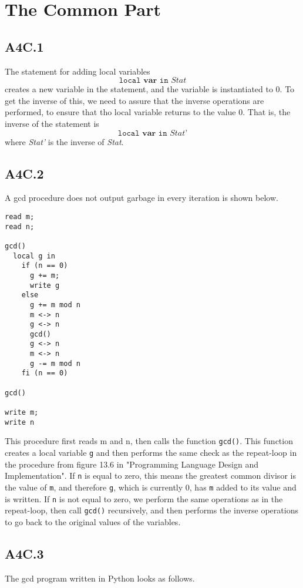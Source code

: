 \section*{The Common Part}

\subsection*{A4C.1}
The statement for adding local variables
$$\texttt{local } \textbf{var } \texttt{in } \textit{Stat}$$
creates a new variable in the statement, and the variable is instantiated to $0$. To get the inverse of this, we need to assure that the inverse operations are performed, to ensure that tho local variable returns to the value $0$. That is, the inverse of the statement is
$$\texttt{local } \textbf{var } \texttt{in } \textit{Stat'}$$
where \textit{Stat'} is the inverse of \textit{Stat}.

\subsection*{A4C.2}
A gcd procedure does not output garbage in every iteration is shown below.

\begin{verbatim}
read m;
read n;

gcd()
  local g in
    if (n == 0)
      g += m;
      write g
    else
      g += m mod n
      m <-> n
      g <-> n
      gcd()
      g <-> n
      m <-> n
      g -= m mod n
    fi (n == 0)

gcd()

write m;
write n
\end{verbatim}

This procedure first reads m and n, then calls the function \texttt{gcd()}. This function creates a local variable \texttt{g} and then performs the same check as the repeat-loop in the procedure from figure 13.6 in "Programming Language Design and Implementation". If \texttt{n} is equal to zero, this means the greatest common divisor is the value of \texttt{m}, and therefore \texttt{g}, which is currently $0$, has \texttt{m} added to its value and is written. If \texttt{n} is not equal to zero, we perform the same operations as in the repeat-loop, then call \texttt{gcd()} recursively, and then performs the inverse operations to go back to the original values of the variables.

\subsection*{A4C.3}
The gcd program written in Python looks as follows.

